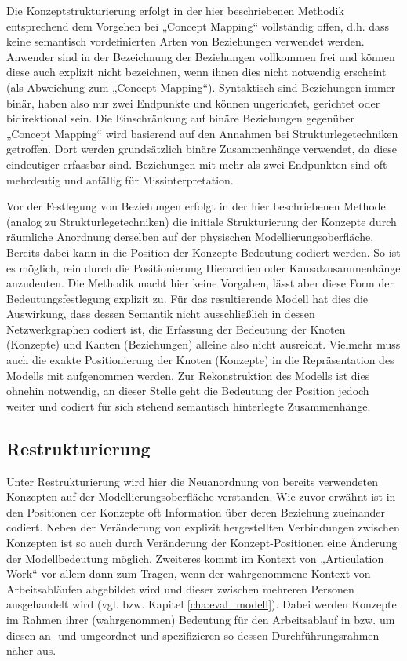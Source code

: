 Die Konzeptstrukturierung erfolgt in der hier beschriebenen Methodik entsprechend dem Vorgehen bei „Concept Mapping“ vollständig offen, d.h. dass keine semantisch vordefinierten Arten von Beziehungen verwendet werden. Anwender sind in der Bezeichnung der Beziehungen vollkommen frei und können diese auch explizit nicht bezeichnen, wenn ihnen dies nicht notwendig erscheint (als Abweichung zum „Concept Mapping“). Syntaktisch sind Beziehungen immer binär, haben also nur zwei Endpunkte und können ungerichtet, gerichtet oder bidirektional sein. Die Einschränkung auf binäre Beziehungen gegenüber „Concept Mapping“ wird basierend auf den Annahmen bei Strukturlegetechniken getroffen. Dort werden grundsätzlich binäre Zusammenhänge verwendet, da diese eindeutiger erfassbar sind. Beziehungen mit mehr als zwei Endpunkten sind oft mehrdeutig und anfällig für Missinterpretation.

Vor der Festlegung von Beziehungen erfolgt in der hier beschriebenen Methode (analog zu Strukturlegetechniken) die initiale Strukturierung der Konzepte durch räumliche Anordnung derselben auf der physischen Modellierungsoberfläche. Bereits dabei kann in die Position der Konzepte Bedeutung codiert werden. So ist es möglich, rein durch die Positionierung Hierarchien oder Kausalzusammenhänge anzudeuten. Die Methodik macht hier keine Vorgaben, lässt aber diese Form der Bedeutungsfestlegung explizit zu. Für das resultierende Modell hat dies die Auswirkung, dass dessen Semantik nicht ausschließlich in dessen Netzwerkgraphen codiert ist, die Erfassung der Bedeutung der Knoten (Konzepte) und Kanten (Beziehungen) alleine also nicht ausreicht. Vielmehr muss auch die exakte Positionierung der Knoten (Konzepte) in die Repräsentation des Modells mit aufgenommen werden. Zur Rekonstruktion des Modells ist dies ohnehin notwendig, an dieser Stelle geht die Bedeutung der Position jedoch weiter und codiert für sich stehend semantisch hinterlegte Zusammenhänge. 

\subsection{Restrukturierung}

Unter Restrukturierung wird hier die Neuanordnung von bereits verwendeten Konzepten auf der Modellierungsoberfläche verstanden. Wie zuvor erwähnt ist in den Positionen der Konzepte oft Information über deren Beziehung zueinander codiert. Neben der Veränderung von explizit hergestellten Verbindungen zwischen Konzepten ist so auch durch Veränderung der Konzept-Positionen eine Änderung der Modellbedeutung möglich. Zweiteres kommt im Kontext von „Articulation Work“ vor allem dann zum Tragen, wenn der wahrgenommene Kontext von Arbeitsabläufen abgebildet wird und dieser zwischen mehreren Personen ausgehandelt wird (vgl. \citep{Wahlmuller10} bzw. Kapitel \ref{cha:eval_modell}). Dabei werden Konzepte im Rahmen ihrer (wahrgenommen) Bedeutung für den Arbeitsablauf in bzw. um diesen an- und umgeordnet und spezifizieren so dessen Durchführungsrahmen näher aus. 

